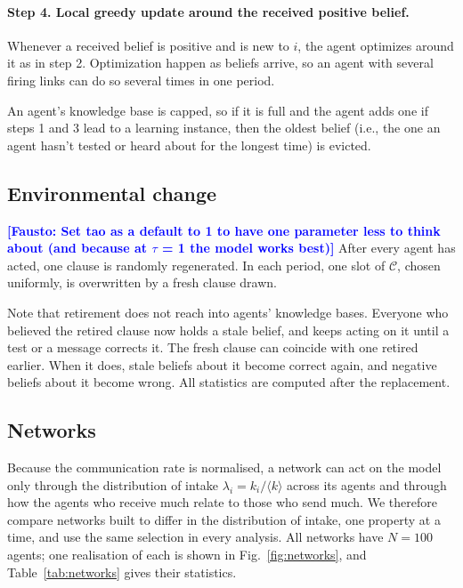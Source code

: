 \documentclass[11pt]{article}
\newcommand{\fausto}[1]{\textcolor{blue}{\textbf{[Fausto: #1]}}}
\begin{document}
\paragraph{Step 4. Local greedy update around the received positive belief.} Whenever a received belief is positive and is new to $i$, the agent optimizes around it as in step 2. Optimization happen as beliefs arrive, so an agent with several firing links can do so several times in one period.

An agent's knowledge base is capped, so if it is full and the agent adds one if steps 1 and 3 lead to a learning instance, then the oldest belief (i.e., the one an agent hasn't tested or heard about for the longest time) is evicted.


\subsection{Environmental change}
\fausto{Set tao as a default to 1 to have one parameter less to think about (and because at $\tau$ = 1 the model works best)}
After every agent has acted, one clause is randomly regenerated. In each period, one slot of $\mathcal{C}$, chosen uniformly, is overwritten by a fresh clause drawn. %

Note that retirement does not reach into agents' knowledge bases. Everyone who believed the retired clause now holds a stale belief, and keeps acting on it until a test or a message corrects it. The fresh clause can coincide with one retired earlier. When it does, stale beliefs about it become correct again, and negative beliefs about it become wrong. All statistics are computed after the replacement.

\subsection{Networks}\label{sec:networks}

Because the communication rate is normalised, a network can act on the model only through the distribution of intake $\lambda_i = k_i/\langle k\rangle$ across its agents and through how the agents who receive much relate to those who send much. We therefore compare networks built to differ in the distribution of intake, one property at a time, and use the same selection in every analysis. All networks have $N = 100$ agents; one realisation of each is shown in Fig.~\ref{fig:networks}, and Table~\ref{tab:networks} gives their statistics.
\end{document}
